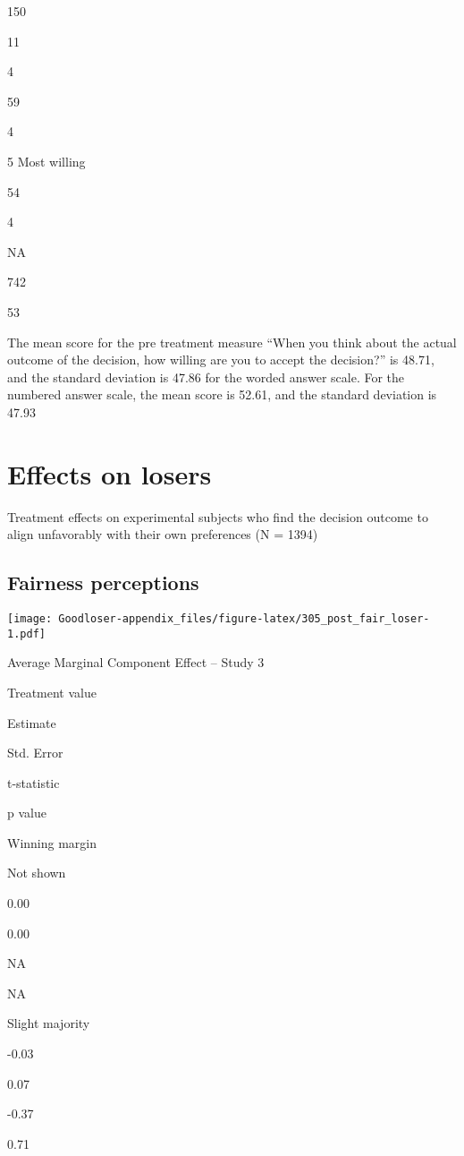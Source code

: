 \documentclass[
]{book}
\begin{document}
150

11

4

59

4

5 Most willing

54

4

NA

742

53

The mean score for the pre treatment measure ``When you think about the
actual outcome of the decision, how willing are you to accept the
decision?'' is 48.71, and the standard deviation is 47.86 for the worded
answer scale. For the numbered answer scale, the mean score is 52.61,
and the standard deviation is 47.93

\hypertarget{effects-on-losers-2}{%
\chapter{Effects on losers}\label{effects-on-losers-2}}

Treatment effects on experimental subjects who find the decision outcome
to align unfavorably with their own preferences (N = 1394)

\hypertarget{fairness-perceptions}{%
\section{Fairness perceptions}\label{fairness-perceptions}}

\texttt{[image: Goodloser-appendix\_files/figure-latex/305\_post\_fair\_loser-1.pdf]}

Average Marginal Component Effect -- Study 3

Treatment value

Estimate

Std. Error

t-statistic

p value

Winning margin

Not shown

0.00

0.00

NA

NA

Slight majority

-0.03

0.07

-0.37

0.71
\end{document}
